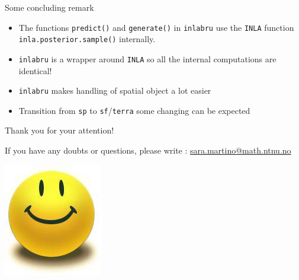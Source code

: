 \documentclass[
  ignorenonframetext,
]{beamer}
\begin{document}
\begin{frame}[fragile]{Some concluding remark}
\protect\hypertarget{some-concluding-remark}{}
\begin{itemize}
\item
  The functions \texttt{predict()} and \texttt{generate()} in
  \texttt{inlabru} use the \texttt{INLA} function
  \texttt{inla.posterior.sample()} internally.
\item
  \texttt{inlabru} is a wrapper around \texttt{INLA} so all the internal
  computations are identical!
\item
  \texttt{inlabru} makes handling of spatial object a lot easier
\item
  Transition from \texttt{sp} to \texttt{sf}/\texttt{terra} some
  changing can be expected
\end{itemize}
\end{frame}

\begin{frame}{}
\protect\hypertarget{section-1}{}
\Large

Thank you for your attention!

\normalsize

If you have any doubts or questions, please write :
\url{sara.martino@math.ntnu.no}

\begin{center}\includegraphics[width=0.3\linewidth]{graphics/smiley_small} \end{center}
\end{frame}
\end{document}
